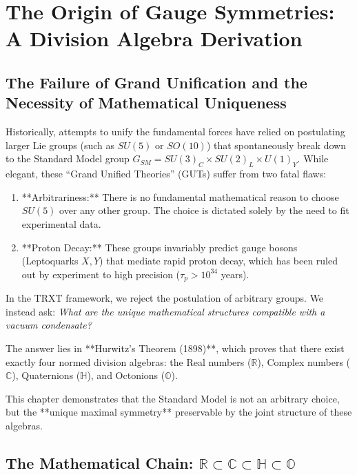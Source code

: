 

\section{The Origin of Gauge Symmetries: A Division Algebra Derivation}
\label{sec:division_algebras}


\subsection{The Failure of Grand Unification and the Necessity of Mathematical Uniqueness}

Historically, attempts to unify the fundamental forces have relied on postulating larger Lie groups (such as $SU(5)$ or $SO(10)$) that spontaneously break down to the Standard Model group $G_{SM} = SU(3)_C \times SU(2)_L \times U(1)_Y$. While elegant, these ``Grand Unified Theories'' (GUTs) suffer from two fatal flaws:
\begin{enumerate}
    \item **Arbitrariness:** There is no fundamental mathematical reason to choose $SU(5)$ over any other group. The choice is dictated solely by the need to fit experimental data.
    \item **Proton Decay:** These groups invariably predict gauge bosons (Leptoquarks $X, Y$) that mediate rapid proton decay, which has been ruled out by experiment to high precision ($\tau_p > 10^{34}$ years).
\end{enumerate}

In the TRXT framework, we reject the postulation of arbitrary groups. We instead ask: \textit{What are the unique mathematical structures compatible with a vacuum condensate?}

The answer lies in **Hurwitz's Theorem (1898)**, which proves that there exist exactly four normed division algebras: the Real numbers ($\mathbb{R}$), Complex numbers ($\mathbb{C}$), Quaternions ($\mathbb{H}$), and Octonions ($\mathbb{O}$).

This chapter demonstrates that the Standard Model is not an arbitrary choice, but the **unique maximal symmetry** preservable by the joint structure of these algebras.

\subsection{The Mathematical Chain: $\mathbb{R} \subset \mathbb{C} \subset \mathbb{H} \subset \mathbb{O}$}

